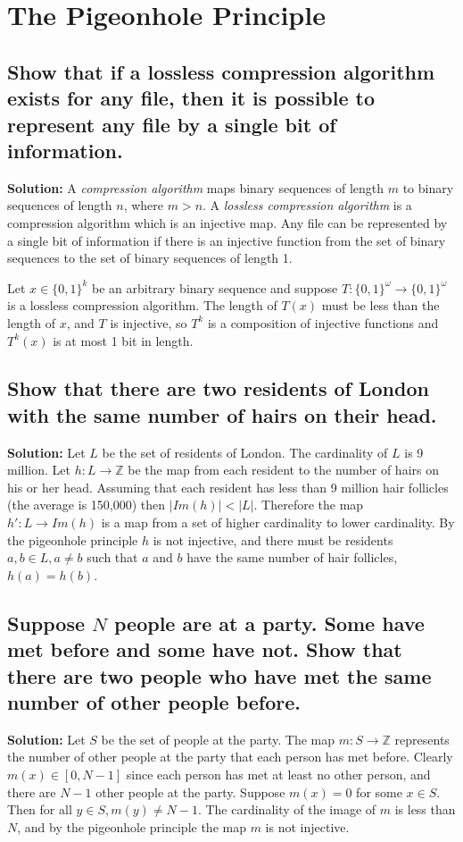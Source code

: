 \documentclass{article}
\newcommand{\exercise}[1]{\subsection{\normalfont #1}}
\newcommand{\solution}{\indent\indent \textbf{Solution: }}
\begin{document}
\newpage
\section{The Pigeonhole Principle}

\exercise{Show that if a lossless compression algorithm exists for any file, then it is possible to represent any file by a single bit of information.}
\solution
A \textit{compression algorithm} maps binary sequences of length $m$ to binary sequences of length $n$, where $m>n$. A \textit{lossless compression algorithm} is a compression algorithm which is an injective map. Any file can be represented by a single bit of information if there is an injective function from the set of binary sequences to the set of binary sequences of length 1.

Let $x\in \{0, 1\}^k$ be an arbitrary binary sequence and suppose $T:\{0,1\}^\omega \to \{0, 1\}^\omega$ is a lossless compression algorithm. The length of $T(x)$ must be less than the length of $x$, and $T$ is injective, so $T^k$ is a composition of injective functions and $T^k(x)$ is at most 1 bit in length. 

\exercise{Show that there are two residents of London with the same number of hairs on their head.}
\solution
Let $L$ be the set of residents of London. The cardinality of $L$ is 9 million. Let $h:L\to \mathbb{Z}$ be the map from each resident to the number of hairs on his or her head. Assuming that each resident has less than 9 million hair follicles (the average is 150,000) then $\vert Im(h)\vert < \vert L \vert$. Therefore the map $h': L\to Im(h)$ is a map from a set of higher cardinality to lower cardinality. By the pigeonhole principle $h$ is not injective, and there must be residents $a, b \in L, a\neq b$ such that $a$ and $b$ have the same number of hair follicles, $h(a)=h(b)$.

\exercise{Suppose $N$ people are at a party. Some have met before and some have not. Show that there are two people who have met the same number of other people before.} 
\solution
Let $S$ be the set of people at the party. The map $m:S\to \mathbb{Z}$ represents the number of other people at the party that each person has met before. Clearly $m(x) \in [0, N-1]$ since each person has met at least no other person, and there are $N-1$ other people at the party. Suppose $m(x) = 0$ for some $x\in S$. Then for all $y\in S, m(y) \neq N-1$. The cardinality of the image of $m$ is less than $N$, and by the pigeonhole principle the map $m$ is not injective. 
\end{document}
